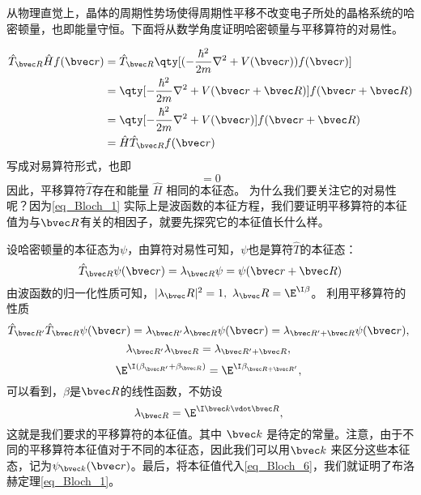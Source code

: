 从物理直觉上，晶体的周期性势场使得周期性平移不改变电子所处的晶格系统的哈密顿量，也即能量守恒。下面将从数学角度证明哈密顿量与平移算符的对易性。

\begin{align}
\hat{T}_{\bvec R} \hat{H} f(\bvec r) &= \hat{T}_{\bvec R} \qty[(-\frac{\hbar^2}{2m}\nabla^2+V(\bvec r) ) f(\bvec r)] \\
&= \qty[-\frac{\hbar^2}{2m}\nabla^2+V(\bvec r + \bvec R)]  f(\bvec r + \bvec R)\\
&= \qty[-\frac{\hbar^2}{2m}\nabla^2+V(\bvec r) ] f(\bvec r+ \bvec R)\\
& = \hat{H} \hat{T}_{\bvec R} f(\bvec r)
\end{align}
写成对易算符形式，也即
\begin{equation}
[\hat{T},\hat{H}] = 0
\end{equation}
因此，平移算符$\hat{T}$存在和能量 $\hat{H}$ 相同的本征态。
为什么我们要关注它的对易性呢？因为\autoref{eq_Bloch_1} 实际上是波函数的本征方程，我们要证明平移算符的本征值为与$\bvec R$有关的相因子，就要先探究它的本征值长什么样。

设哈密顿量的本征态为$\psi$，由算符对易性可知，$\psi$也是算符$\hat{T}$的本征态：
\begin{equation}\label{eq_Bloch_6}
\hat{T}_{\bvec R} \psi (\bvec r) = \lambda_{\bvec R}\psi =\psi(\bvec r + \bvec R) 
\end{equation}
由波函数的归一化性质可知，$|\lambda_\bvec R |^2 = 1,~ \lambda_\bvec R = \E^{\I \beta}$。 利用平移算符的性质
\begin{equation}
\hat{T}_{\bvec R'} \hat{T}_{\bvec R}\psi (\bvec r) = \lambda_{\bvec R'}\lambda_{\bvec R}\psi (\bvec r) = \lambda_{\bvec R' + \bvec R} \psi (\bvec r),~
\end{equation}
\begin{equation}
\lambda_{\bvec R'}\lambda_{\bvec R} =  \lambda_{\bvec R' + \bvec R},~
\end{equation}
\begin{equation}
\E^{\I (\beta_{\bvec R'}+ \beta_{\bvec R})} = \E^{\I \beta_{\bvec R + \bvec R'}},~
\end{equation}
可以看到，$\beta$是$\bvec R$的线性函数，不妨设
\begin{equation}
\lambda_{\bvec R} = \E^{\I \bvec k \vdot  \bvec R},~
\end{equation}
这就是我们要求的平移算符的本征值。其中 $\bvec k$ 是待定的常量。注意，由于不同的平移算符本征值对于不同的本征态，因此我们可以用$\bvec k$ 来区分这些本征态，记为$\psi_{\bvec k} (\bvec r)$。最后，将本征值代入\autoref{eq_Bloch_6}，我们就证明了布洛赫定理\autoref{eq_Bloch_1}。

